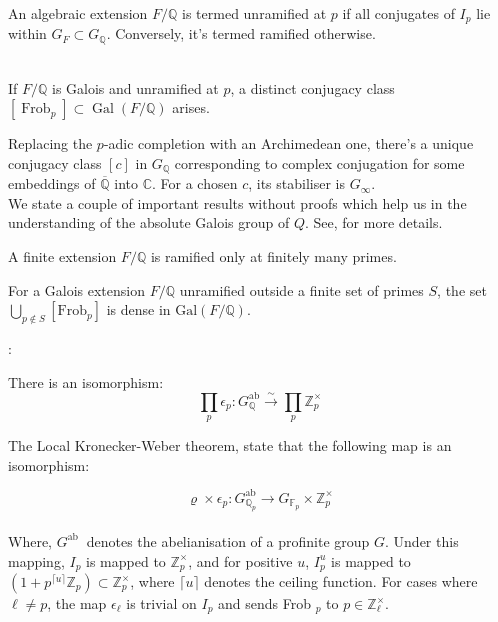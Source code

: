 \begin{definition}
    An algebraic extension $F / \mathbb{Q}$ is termed unramified at $p$ if all conjugates of $I_{p}$ lie within $G_{F} \subset G_{\mathbb{Q}}$. Conversely, it's termed ramified otherwise.
\end{definition} \\

If $F / \mathbb{Q}$ is Galois and unramified at $p$, a distinct conjugacy class $\left[\operatorname{Frob}_{p}\right] \subset \operatorname{Gal}(F / \mathbb{Q})$ arises.

Replacing the $p$-adic completion with an Archimedean one, there's a unique conjugacy class $[c]$ in $G_{\mathbb{Q}}$ corresponding to complex conjugation for some embeddings of $\overline{\mathbb{Q}}$ into $\mathbb{C}$. For a chosen $c$, its stabiliser is $G_{\infty}$.
\\
We state a couple of important results without proofs which help us in the understanding of the absolute Galois group of $Q$. See, \cite{darmon1995fermat} for more details.  

\begin{theorem}
A finite extension $F / \mathbb{Q}$ is ramified only at finitely many primes.
    
\end{theorem}

\begin{theorem}
    For a Galois extension $F / \mathbb{Q}$ unramified outside a finite set of primes $S$, the set $\bigcup_{p \notin S}\left[\mathrm{Frob}_{p}\right]$ is dense in $\mathrm{Gal}(F / \mathbb{Q})$.

\end{theorem}: 

\begin{theorem}
    
There is an isomorphism:
$$
\prod_{p} \epsilon_{p}: G_{\mathbb{Q}}^{\mathrm{ab}} \stackrel{\sim}{\rightarrow} \prod_{p} \mathbb{Z}_{p}^{\times}
$$

\end{theorem}

The Local Kronecker-Weber theorem, state that the following map is an isomorphism:

$$
\varrho \times \epsilon_{p}: G_{\mathbb{Q}_{p}}^{\mathrm{ab}} \longrightarrow G_{\mathbb{F}_{p}} \times \mathbb{Z}_{p}^{\times}
$$
\\

Where, $G^{\text {ab }}$ denotes the abelianisation of a profinite group $G$. Under this mapping, $I_{p}$ is mapped to $\mathbb{Z}_{p}^{\times}$, and for positive $u$, $I_{p}^{u}$ is mapped to $\left(1+p^{\lceil u\rceil} \mathbb{Z}_{p}\right) \subset \mathbb{Z}_{p}^{\times}$, where $\lceil u\rceil$ denotes the ceiling function. For cases where $\ell \neq p$, the map $\epsilon_{\ell}$ is trivial on $I_{p}$ and sends Frob $_{p}$ to $p \in \mathbb{Z}_{\ell}^{\times}$.\

